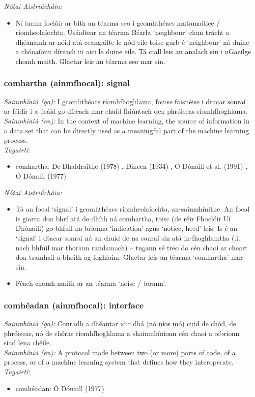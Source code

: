  \noindent \textit{Nótaí Aistriúcháin:}
\begin{itemize}
	\item Ní luann foclóir ar bith an téarma seo i gcomhthéacs matamaitice / ríomheolaíochta. Úsáidtear an téarma Béarla `neighbour' chun trácht a dhéanamh ar nóid atá ceangailte le nód eile toisc gurb é `neighbour' ná duine a chónaíonn díreach in aici le duine eile. Tá ciall leis an analach sin i nGaeilge chomh maith. Glactar leis an téarma seo mar sin.
\end{itemize}


\subsubsection*{comhartha (ainmfhocal): signal}
 \noindent \textit{Sainmhíniú (ga):} I gcomhthéacs ríomhfhoghlama, foinse faisnéise i dtacar sonraí ar féidir í a úsáid go díreach mar chuid fhiúntach den phróiseas ríomhfhoghlama.
\\
 \noindent \textit{Sainmhíniú (en):} In the context of machine learning, the source of information in a data set that can be directly used as a meaningful part of the machine learning process.
\\
 \noindent \textit{Tagairtí:}
\begin{itemize}
	\item comhartha: De Bhaldraithe (1978) \cite{de-bhaldraithe}, Dineen (1934) \cite{dineen}, Ó Dónaill et al. (1991) \cite{focloir-beag}, Ó Dónaill (1977) \cite{odonaill}
\end{itemize}

 \noindent \textit{Nótaí Aistriúcháin:}
\begin{itemize}
	\item Tá an focal `signal' i gcomhthéacs ríomheolaíochta, an-sainmhínithe. An focal is giorra don bhrí atá de dhíth ná comhartha, toisc (de réir Fhoclóir Uí Dhónaill) go bhfuil na bríonna `indication' agus `notice, heed' leis. Is é an `signal' i dtacar sonraí ná an chuid de na sonraí sin atá in-fhoghlamtha (.i. nach bhfuil mar thorann randamach) -- tugann sé treo do cén chaoi ar cheart don tsamhail a bheith ag foghlaim. Glactar leis an téarma `comhartha' mar sin.
	\item Féach chomh maith ar an téarma `noise / torann'.
\end{itemize}


\subsubsection*{comhéadan (ainmfhocal): interface}
 \noindent \textit{Sainmhíniú (ga):} Conradh a dhéantar idir dhá (nó níos mó) cuid de chód, de phróiseas, nó de chóras ríomhfhoghlama a shainmhíníonn cén chaoi a oibríonn siad lena chéile.
\\
 \noindent \textit{Sainmhíniú (en):} A protocol made between two (or more) parts of code, of a process, or of a machine learning system that defines how they interoperate.
\\
 \noindent \textit{Tagairtí:}
\begin{itemize}
	\item comhéadan: Ó Dónaill (1977) \cite{odonaill}
\end{itemize}

